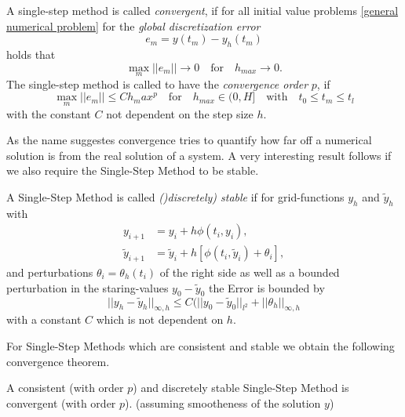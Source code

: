 	\begin{definition}\label{Convergence_SingleStep}
		A single-step method is called \emph{convergent}, if for all initial value problems \ref{general numerical problem} for the \emph{global discretization error}
		\begin{displaymath}
			e_m = y(t_m)-y_h(t_m)
		\end{displaymath}
		holds that
		\begin{displaymath}
			\max\limits_{m}||e_m|| \to 0 \quad \text{for} \quad h_{max} \to 0.
		\end{displaymath}
		The single-step method is called to have the \emph{convergence order} $p$, if
		\begin{displaymath}
			\max\limits_{m} ||e_m|| \leq C h_max^p \quad \text{for} \quad h_{max} \in \mathopen{(} 0,H \mathclose{]} \quad \text{with} \quad t_0 \leq t_m \leq t_l
		\end{displaymath}
		with the constant $C$ not dependent on the step size $h$.
	\end{definition}

	As the name suggestes convergence tries to quantify how far off a numerical solution is from the real solution of a system. A very interesting result follows if we also require the Single-Step Method to be stable.
	
	\begin{definition}\label{Discrete_Stability_SingleStep - lecture notes for numpdgl}
		A Single-Step Method is called \emph{()discretely) stable} if for grid-functions $y_h$ and $\tilde{y}_h$ with
		\begin{align}
			y_{i+1} &= y_i + h \phi(t_i, y_i), \\
			\tilde{y}_{i+1} &=  \tilde{y}_i + h [\phi(t_i, \tilde{y}_i) + \theta_i],
		\end{align}
		and perturbations $\theta_i = \theta_h(t_i)$ of the right side as well as a bounded perturbation in the staring-values $y_0 - \tilde{y}_0$ the Error is bounded by
		\begin{displaymath}
			||y_h - \tilde{y}_h||_{\infty,h} \leq C (||y_0 - \tilde{y}_0||_{l^2} + ||\theta_h||_{\infty,h}
		\end{displaymath}
		with a constant $C$ which is not dependent on $h$.
	\end{definition}
	
	For Single-Step Methods which are consistent and stable we obtain the following convergence theorem.
	
	\begin{theorem}\label{Lax-Richtmyer}
		A consistent (with order $p$) and discretely stable Single-Step Method is convergent (with order $p$). (assuming smootheness of the solution $y$)
	\end{theorem}
	
